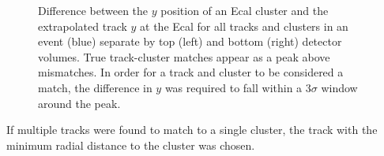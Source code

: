 \begin{figure}[h]
\begin{subfigure}{.5\textwidth}
    \end{subfigure}
    \caption{Difference between the $y$ position of an Ecal cluster and the 
             extrapolated track $y$ at the Ecal for all tracks and clusters in 
             an event (blue) separate by top (left) and bottom (right) detector
             volumes.  True track-cluster matches appear as a peak 
             above mismatches.  In order for a track and cluster to be considered
             a match, the difference in $y$ was required to fall within a 3$\sigma$
             window around the peak.}
    \label{fig:track_cluster_delta_y}
\end{figure}
\begin{table}[h!b]
    \centering
    \caption{Boundaries used to denote the 3$\sigma$ window used to establish if 
             an Ecal cluster and SVT track are matched to each other.  Due to 
             global misalignments, different windows are needed for top and 
             bottom tracks and clusters.}
    \label{tab:track_cluster_cuts}
\end{table}
If multiple tracks were found to match to a single cluster, the track 
with the minimum radial distance to the cluster was chosen.  


